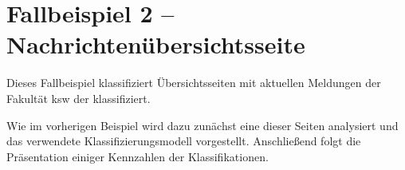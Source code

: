\section{Fallbeispiel 2 -- Nachrichtenübersichtsseite}
    Dieses Fallbeispiel klassifiziert Übersichtsseiten mit aktuellen
    Meldungen der Fakultät \gls{ksw} der {\fernUni} klassifiziert.

    Wie im vorherigen Beispiel wird dazu zunächst eine dieser Seiten analysiert
    und das verwendete Klassifizierungsmodell vorgestellt.
    Anschließend folgt die Präsentation einiger Kennzahlen der Klassifikationen.

    
    
    
    
